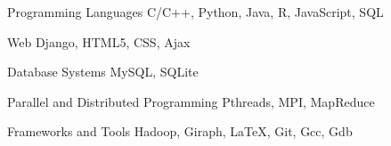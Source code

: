 

\begin{cvskills}

  \cvskill
    {Programming Languages} %
    {C/C++, Python, Java, R, JavaScript, SQL} %

  \cvskill
    {Web} %
    {Django, HTML5, CSS, Ajax} %

  \cvskill
    {Database Systems} %
    {MySQL, SQLite} %

  \cvskill
    {Parallel and Distributed Programming} %
    {Pthreads, MPI, MapReduce} %

  \cvskill
    {Frameworks and Tools} %
    {Hadoop, Giraph, \LaTeX, Git, Gcc, Gdb} %

\end{cvskills}
